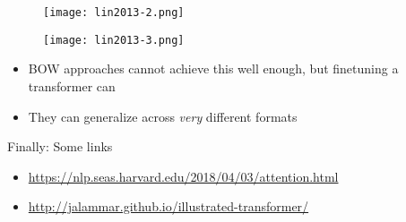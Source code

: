 \begin{frame}[plain]
\begin{figure}
	\centering
	\texttt{[image: lin2013-2.png]}
\end{figure}
\end{frame}


\begin{frame}[plain]
\begin{figure}
	\centering
	\texttt{[image: lin2013-3.png]}
\end{figure}
\end{frame}


\begin{frame}{\textcite{Lin2023}}
  \begin{itemize}
  \item BOW approaches cannot achieve this well enough, but finetuning a transformer can
  \item They can generalize across \emph{very} different formats
  \end{itemize}

\end{frame}





\begin{frame}{Finally: Some links}
\begin{itemize}
\item \url{https://nlp.seas.harvard.edu/2018/04/03/attention.html}
\item \url{http://jalammar.github.io/illustrated-transformer/}
\end{itemize}
\end{frame}



